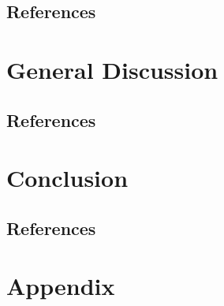 \documentclass[12pt,a4paper,twoside,openright]{book}
\begin{document}
\begin{sloppy}
\begin{refsection}
\section{References}
\printbibliography[heading=none]
\end{refsection}


\newpage
\thispagestyle{empty}
\chapter{General Discussion \label{ch:discussion}}

\clearpage \thispagestyle{empty}\mbox{}\clearpage
\begin{refsection}

\newpage
\section{References}
\printbibliography[heading=none]
\end{refsection}

\newpage
\chapter{Conclusion \label{ch:conclusion}}

\clearpage \thispagestyle{empty}\mbox{}\clearpage
\begin{conclusion}

\newpage
\section{References}
\printbibliography[heading=none]
\end{conclusion}

\newpage
\chapter{Appendix}



\end{sloppy}
\end{document}
